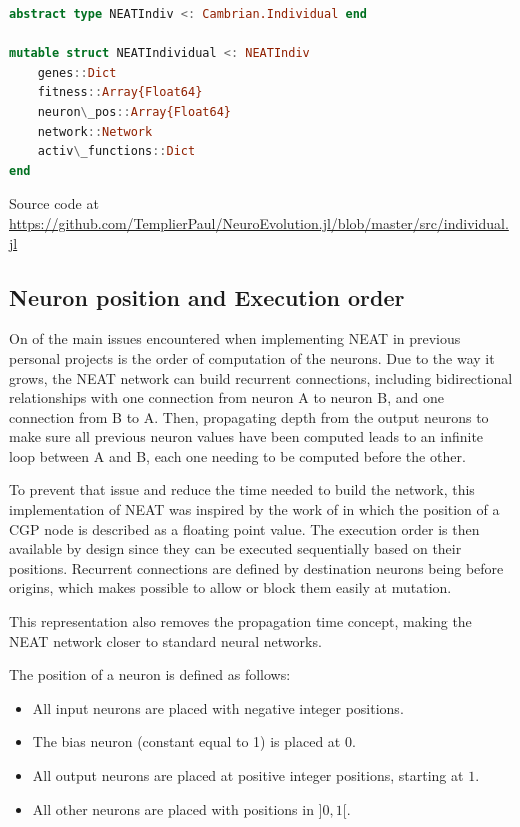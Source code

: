 \begin{minipage}{\linewidth}
\begin{lstlisting}[language=Julia, caption=NEAT Individual]
abstract type NEATIndiv <: Cambrian.Individual end

mutable struct NEATIndividual <: NEATIndiv
    genes::Dict
    fitness::Array{Float64}
    neuron\_pos::Array{Float64}
    network::Network
    activ\_functions::Dict
end
\end{lstlisting}
Source code at \url{https://github.com/TemplierPaul/NeuroEvolution.jl/blob/master/src/individual.jl}\\
\end{minipage}

\subsection{Neuron position and Execution order}
\label{subsec:NEAT_neur_pos}

On of the main issues encountered when implementing NEAT in previous personal projects is the order of computation of the neurons. Due to the way it grows, the NEAT network can build recurrent connections, including bidirectional relationships with one connection from neuron A to neuron B, and one connection from B to A. Then, propagating depth from the output neurons to make sure all previous neuron values have been computed leads to an infinite loop between A and B, each one needing to be computed before the other. 

To prevent that issue and reduce the time needed to build the network, this implementation of NEAT was inspired by the work of \cite{wilson2018positionalcgp} in which the position of a CGP node is described as a floating point value. The execution order is then available by design since they can be executed sequentially based on their positions. Recurrent connections are defined by destination neurons being before origins, which makes possible to allow or block them easily at mutation. 

This representation also removes the propagation time concept, making the NEAT network closer to standard neural networks. 

The position of a neuron is defined as follows:
\begin{itemize}
    \item All input neurons are placed with negative integer positions.  
    \item The bias neuron (constant equal to 1) is placed at $0$.  
    \item All output neurons are placed at positive integer positions, starting at $1$.
    \item All other neurons are placed with positions in $]0, 1[$.
\end{itemize}

